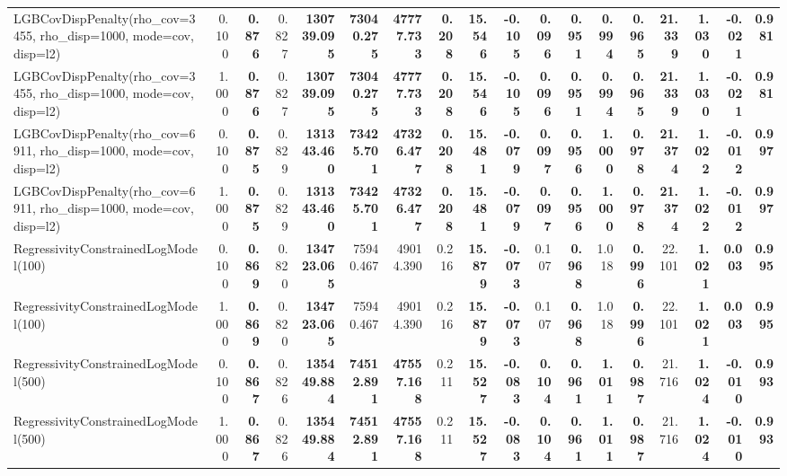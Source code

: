 \documentclass[11pt]{article}
\theoremstyle{plain}
\theoremstyle{definition}
\newcommand{\1}{\mathbf{1}}
\begin{document}
\begin{table}[htbp]
{\begin{tabular}{lrrrrrrrrrrrrrrrrr}
LGBCovDispPenalty(rho_cov=3455, rho_disp=1000, mode=cov, disp=l2) & 0.100 & \textbf{0.876} & 0.827 & \textbf{130739.095} & \textbf{73040.275} & \textbf{47777.733} & \textbf{0.208} & \textbf{15.546} & \textbf{-0.105} & \textbf{0.096} & \textbf{0.951} & \textbf{0.994} & \textbf{0.965} & \textbf{21.339} & \textbf{1.030} & \textbf{-0.021} & \textbf{0.981} \\
LGBCovDispPenalty(rho_cov=3455, rho_disp=1000, mode=cov, disp=l2) & 1.000 & \textbf{0.876} & 0.827 & \textbf{130739.095} & \textbf{73040.275} & \textbf{47777.733} & \textbf{0.208} & \textbf{15.546} & \textbf{-0.105} & \textbf{0.096} & \textbf{0.951} & \textbf{0.994} & \textbf{0.965} & \textbf{21.339} & \textbf{1.030} & \textbf{-0.021} & \textbf{0.981} \\
LGBCovDispPenalty(rho_cov=6911, rho_disp=1000, mode=cov, disp=l2) & 0.100 & \textbf{0.875} & 0.829 & \textbf{131343.460} & \textbf{73425.701} & \textbf{47326.477} & \textbf{0.208} & \textbf{15.481} & \textbf{-0.079} & \textbf{0.097} & \textbf{0.956} & \textbf{1.000} & \textbf{0.978} & \textbf{21.374} & \textbf{1.022} & \textbf{-0.012} & \textbf{0.997} \\
LGBCovDispPenalty(rho_cov=6911, rho_disp=1000, mode=cov, disp=l2) & 1.000 & \textbf{0.875} & 0.829 & \textbf{131343.460} & \textbf{73425.701} & \textbf{47326.477} & \textbf{0.208} & \textbf{15.481} & \textbf{-0.079} & \textbf{0.097} & \textbf{0.956} & \textbf{1.000} & \textbf{0.978} & \textbf{21.374} & \textbf{1.022} & \textbf{-0.012} & \textbf{0.997} \\
RegressivityConstrainedLogModel(100) & 0.100 & \textbf{0.869} & 0.820 & \textbf{134723.065} & 75940.467 & 49014.390 & 0.216 & \textbf{15.879} & \textbf{-0.073} & 0.107 & \textbf{0.968} & 1.018 & \textbf{0.996} & 22.101 & \textbf{1.021} & \textbf{0.003} & \textbf{0.995} \\
RegressivityConstrainedLogModel(100) & 1.000 & \textbf{0.869} & 0.820 & \textbf{134723.065} & 75940.467 & 49014.390 & 0.216 & \textbf{15.879} & \textbf{-0.073} & 0.107 & \textbf{0.968} & 1.018 & \textbf{0.996} & 22.101 & \textbf{1.021} & \textbf{0.003} & \textbf{0.995} \\
RegressivityConstrainedLogModel(500) & 0.100 & \textbf{0.867} & 0.826 & \textbf{135449.884} & \textbf{74512.891} & \textbf{47557.168} & 0.211 & \textbf{15.527} & \textbf{-0.083} & \textbf{0.104} & \textbf{0.961} & \textbf{1.011} & \textbf{0.987} & 21.716 & \textbf{1.024} & \textbf{-0.010} & \textbf{0.993} \\
RegressivityConstrainedLogModel(500) & 1.000 & \textbf{0.867} & 0.826 & \textbf{135449.884} & \textbf{74512.891} & \textbf{47557.168} & 0.211 & \textbf{15.527} & \textbf{-0.083} & \textbf{0.104} & \textbf{0.961} & \textbf{1.011} & \textbf{0.987} & 21.716 & \textbf{1.024} & \textbf{-0.010} & \textbf{0.993} \\

\end{tabular}}
\end{table}
\end{document}
